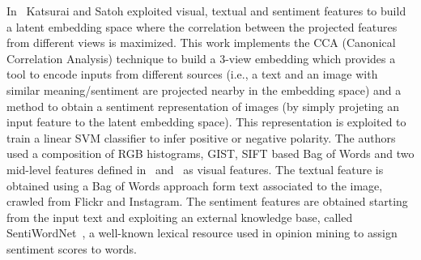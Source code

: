 In~\cite{katsurai2016image} Katsurai and Satoh exploited visual, textual and sentiment features to build a latent embedding space where the correlation between the projected features from different views is maximized. This work implements the CCA (Canonical Correlation Analysis) technique to build a 3-view embedding which provides a tool to encode inputs from different sources (i.e., a text and an image with similar meaning/sentiment are projected nearby in the embedding space) and a method to obtain a sentiment representation of images (by simply projeting an input feature to the latent embedding space). This representation is exploited to train a linear SVM classifier to infer positive or negative polarity. The authors used a composition of RGB histograms, GIST, SIFT based Bag of Words and two mid-level features defined in~\cite{yu2013designing} and~\cite{borth2013large} as visual features. The textual feature is obtained using a Bag of Words approach form text associated to the image, crawled from Flickr and Instagram. The sentiment features are obtained starting from the input text and exploiting an external knowledge base, called SentiWordNet~\cite{esuli2006sentiwordnet}, a well-known lexical resource used in opinion mining to assign sentiment scores to words. 

